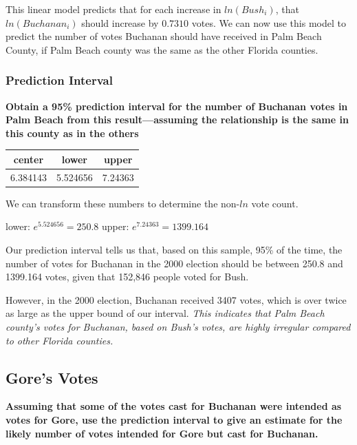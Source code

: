 \documentclass[
  letterpaper,
  DIV=11,
  numbers=noendperiod]{scrartcl}
\begin{document}
This linear model predicts that for each increase in \(ln(Bush_i)\),
that \(ln(Buchanan_i)\) should increase by \(0.7310\) votes. We can now
use this model to predict the number of votes Buchanan should have
received in Palm Beach County, if Palm Beach county was the same as the
other Florida counties.

\hypertarget{prediction-interval}{%
\subsubsection{Prediction Interval}\label{prediction-interval}}

\textbf{Obtain a 95\% prediction interval for the number of Buchanan
votes in Palm Beach from this result---assuming the relationship is the
same in this county as in the others}

\begin{table}[H]
\centering
\begin{tabular}[t]{ccc}
\toprule
center & lower & upper\\
\midrule
6.384143 & 5.524656 & 7.24363\\
\bottomrule
\end{tabular}
\end{table}

We can transform these numbers to determine the non-\(ln\) vote count.

lower: \(e^{5.524656} = 250.8\) upper: \(e^{7.24363} = 1399.164\)

Our prediction interval tells us that, based on this sample, 95\% of the
time, the number of votes for Buchanan in the 2000 election should be
between 250.8 and 1399.164 votes, given that 152,846 people voted for
Bush.

However, in the 2000 election, Buchanan received 3407 votes, which is
over twice as large as the upper bound of our interval. \emph{This
indicates that Palm Beach county's votes for Buchanan, based on Bush's
votes, are highly irregular compared to other Florida counties.}

\hypertarget{gores-votes}{%
\subsection{Gore's Votes}\label{gores-votes}}

\textbf{Assuming that some of the votes cast for Buchanan were intended
as votes for Gore, use the prediction interval to give an estimate for
the likely number of votes intended for Gore but cast for Buchanan.}
\end{document}
